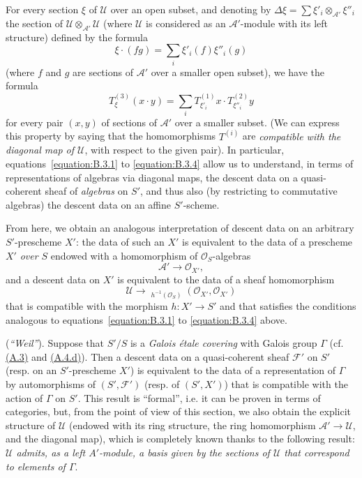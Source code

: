 \documentclass{article}
\theoremstyle{plain}
\theoremstyle{definition}
\newenvironment{example}[1]
  {\renewcommand\theinnercustomexample{#1}\innercustomexample}
  {\endinnercustomexample}
\newcommand{\sh}[1]{{\mathscr{#1}}}
\DeclareMathOperator{\Hom}{Hom}
\DeclareMathOperator{\shHom}{\underline{\Hom}}
\newcommand{\oldpage}[1]{\marginpar{\footnotesize$\Big\vert$ \textit{p.~#1}}}
\begin{document}
For every section $\xi$ of $\sh{U}$ over an open subset, and denoting by $\Delta\xi=\sum\xi'_i\otimes_{\sh{A}'}\xi''_i$ the section of $\sh{U}\otimes_{\sh{A}'}\sh{U}$ (where $\sh{U}$ is considered as an $\sh{A}'$-module with its left structure) defined by the formula
\[
  \xi\cdot(fg) = \sum_i\xi'_i(f)\xi''_i(g)
\]
(where $f$ and $g$ are sections of $\sh{A}'$ over a smaller open subset), we have the formula
\[
\label{equation:B.3.4}
  T_\xi^{(3)}(x\cdot y) = \sum_i T_{\xi'_i}^{(1)}x\cdot T_{\xi''_i}^{(2)}y
\tag{3.4}
\]
for every pair $(x,y)$ of sections of $\sh{A}'$ over a smaller subset.
(We can express this property by saying that the homomorphisms $T^{(i)}$ are \emph{compatible with the diagonal map of $\sh{U}$}, with respect to the given pair).
In particular, equations~\cref{equation:B.3.1} to \cref{equation:B.3.4} allow us to understand, in terms of representations of algebras via diagonal maps, the descent data on a quasi-coherent sheaf of \emph{algebras} on $S'$, and thus also (by restricting to commutative algebras) the descent data on an affine $S'$-scheme.

From here, we obtain an analogous interpretation of descent data on an arbitrary $S'$-prescheme $X'$:
the data of such an $X'$ is equivalent to the data of a prescheme $X'$ \emph{over $S$} endowed with a homomorphism of $\sh{O}_S$-algebras
\[
  \sh{A}'\to\sh{O}_{X'},
\]
and a descent data on $X'$ is equivalent to the data of a sheaf homomorphism
\[
  \sh{U}
  \to \shHom_{h^{-1}(\sh{O}_S)}(\sh{O}_{X'},\sh{O}_{X'})
\]
that is compatible with the morphism $h\colon X'\to S'$ and that satisfies the conditions analogous to equations~\cref{equation:B.3.1} to \cref{equation:B.3.4} above.

\begin{example}{1}
\label{example:B.3(1)}
  (\emph{``Weil''}).
  Suppose that $S'/S$ is a \emph{Galois \'{e}tale covering} with Galois group $\Gamma$ (cf. \hyperref[A.3]{(A.3)} and \hyperref[A.4.d]{(A.4.d)}).
  Then a descent data on a quasi-coherent sheaf $\sh{F}'$ on $S'$ (resp. on an $S'$-prescheme $X'$) is equivalent to the data of a representation of $\Gamma$ by automorphisms of $(S',\sh{F}')$ (resp. of $(S',X')$) that is compatible with the action of $\Gamma$ on $S'$.
  This result
\oldpage{190-23}
  is ``formal'', i.e. it can be proven in terms of categories, but, from the point of view of this section, we also obtain the explicit structure of $\sh{U}$ (endowed with its ring structure, the ring homomorphism $\sh{A}'\to\sh{U}$, and the diagonal map), which is completely known thanks to the following result:
  \emph{$\sh{U}$ admits, as a left $A'$-module, a basis given by the sections of $\sh{U}$ that correspond to elements of $\Gamma$}.
\end{example}
\end{document}
